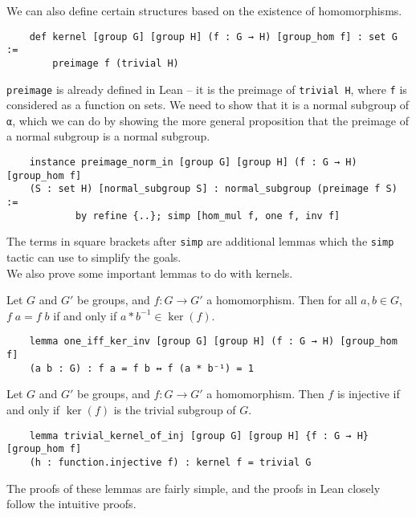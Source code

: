 \documentclass[runningheads,a4paper]{llncs}
\renewcommand{\-}{\setminus}
\begin{document}
We can also define certain structures based on the existence of homomorphisms.

\begin{lstlisting}
    def kernel [group G] [group H] (f : G → H) [group_hom f] : set G := 
        preimage f (trivial H)
\end{lstlisting}

\lstinline{preimage} is already defined in Lean -- it is the preimage of \lstinline{trivial H}, where \lstinline{f} is considered as a function on sets. We need to show that it is a normal subgroup of \lstinline{α}, which we can do by showing the more general proposition that the preimage of a normal subgroup is a normal subgroup.

\begin{lstlisting}
    instance preimage_norm_in [group G] [group H] (f : G → H) [group_hom f]
    (S : set H) [normal_subgroup S] : normal_subgroup (preimage f S) :=
            by refine {..}; simp [hom_mul f, one f, inv f]
\end{lstlisting}

The terms in square brackets after \lstinline{simp} are additional lemmas which the \lstinline{simp} tactic can use to simplify the goals.\\

We also prove some important lemmas to do with kernels.

\begin{lemma}
Let $G$ and $G'$ be groups, and $f: G \to G'$ a homomorphism. Then for all $a,b \in G$, $f\; a = f\; b$ if and only if $a * b^{-1} \in \ker (f)$.
\end{lemma}

\begin{lstlisting}
    lemma one_iff_ker_inv [group G] [group H] (f : G → H) [group_hom f] 
    (a b : G) : f a = f b ↔ f (a * b⁻¹) = 1
\end{lstlisting}

\begin{lemma}
Let $G$ and $G'$ be groups, and $f: G \to G'$ a homomorphism. Then $f$ is injective if and only if $\ker (f)$ is the trivial subgroup of $G$. 
\end{lemma}

\begin{lstlisting}
    lemma trivial_kernel_of_inj [group G] [group H] {f : G → H} [group_hom f] 
    (h : function.injective f) : kernel f = trivial G 
\end{lstlisting}

The proofs of these lemmas are fairly simple, and the proofs in Lean closely follow the intuitive proofs.
\end{document}
